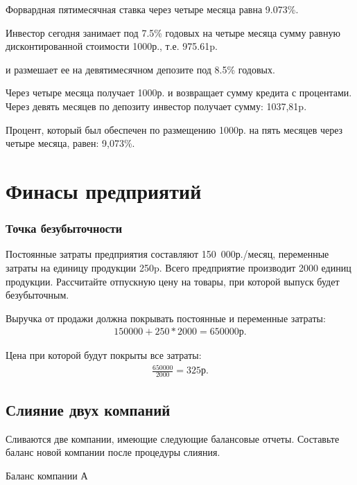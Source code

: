 \documentclass[12pt, table, a4paper,twoside]{exam}
\begin{document}
\begin{questions}
\begin{solution}[12em]

\raggedright
Форвардная пятимесячная ставка через четыре месяца равна 9.073\%.

Инвестор сегодня занимает под 7.5\% годовых на четыре месяца сумму равную дисконтированной стоимости 1000р., т.е. 975.61p.

и размешает ее на девятимесячном депозите под 8.5\% годовых. 

Через четыре месяца получает 1000р. и возвращает сумму кредита с процентами. Через девять месяцев по депозиту инвестор получает сумму: 1037,81p.

Процент, который был обеспечен по размещению 1000р. на пять месяцев через четыре месяца, равен: 9,073\%.
\end{solution}

\vfill\null\cleardoublepage
\section{Финасы предприятий}
\subsubsection{Точка безубыточности}
\question[10] Постоянные затраты предприятия составляют 150~000р./месяц, переменные затраты на единицу продукции 250p. Всего предприятие производит 2000 единиц продукции. Рассчитайте отпускную цену на товары, при которой выпуск будет безубыточным.

\begin{solution}[12em]

	Выручка от продажи должна покрывать постоянные и переменные затраты:
	\begin{align*}
	150000 + 250 * 2000=650 000р.
	\end{align*}
	\raggedright
	Цена при которой будут покрыты все затраты:
	\begin{align*}
	\frac{650000}{2000}=325\text{р.}
	\end{align*}
\end{solution}

\subsection{Слияние двух компаний}
\question[10] Сливаются две компании, имеющие следующие балансовые отчеты. Составьте баланс новой компании после процедуры слияния. 

Баланс компании А 


\end{questions}
\end{document}

